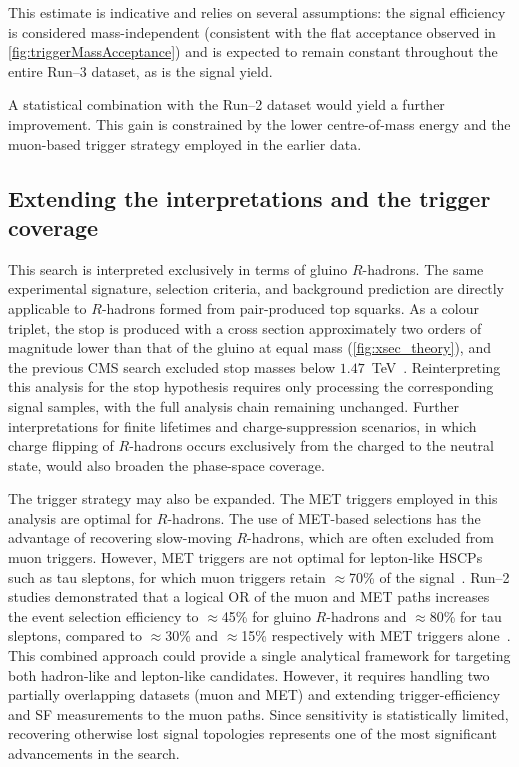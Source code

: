 \vspace{0.5 cm}

This estimate is indicative and relies on several assumptions: the signal efficiency is considered mass-independent (consistent with the flat acceptance observed in \cref{fig:triggerMassAcceptance}) and is expected to remain constant throughout the entire Run--3 dataset, as is the signal yield.

A statistical combination with the Run--2 dataset would yield a further improvement. This gain is constrained by the lower centre-of-mass energy and the muon-based trigger strategy employed in the earlier data.


\subsection{Extending the interpretations and the trigger coverage}

This search is interpreted exclusively in terms of gluino $R$-hadrons. The same experimental signature, selection criteria, and background prediction are directly applicable to $R$-hadrons formed from pair-produced top squarks. As a colour triplet, the stop is produced with a cross section approximately two orders of magnitude lower than that of the gluino at equal mass (\cref{fig:xsec_theory}), and the previous CMS search excluded stop masses below $1.47$~TeV~\cite{HSCP_Run2}. Reinterpreting this analysis for the stop hypothesis requires only processing the corresponding signal samples, with the full analysis chain remaining unchanged. Further interpretations for finite lifetimes and charge-suppression scenarios, in which charge flipping of $R$-hadrons occurs exclusively from the charged to the neutral state, would also broaden the phase-space coverage.

The trigger strategy may also be expanded. The MET triggers employed in this analysis are optimal for $R$-hadrons. The use of MET-based selections has the advantage of recovering slow-moving $R$-hadrons, which are often excluded from muon triggers. However, MET triggers are not optimal for lepton-like HSCPs such as tau sleptons, for which muon triggers retain $\approx$70\% of the signal~\cite{HSCP_Run2}. Run--2 studies demonstrated that a logical OR of the muon and MET paths increases the event selection efficiency to $\approx$45\% for gluino $R$-hadrons and $\approx$80\% for tau sleptons, compared to $\approx$30\% and $\approx$15\% respectively with MET triggers alone~\cite{haebe2024}. This combined approach could provide a single analytical framework for targeting both hadron-like and lepton-like candidates. However, it requires handling two partially overlapping datasets (muon and MET) and extending trigger-efficiency and SF measurements to the muon paths. Since sensitivity is statistically limited, recovering otherwise lost signal topologies represents one of the most significant advancements in the search.


